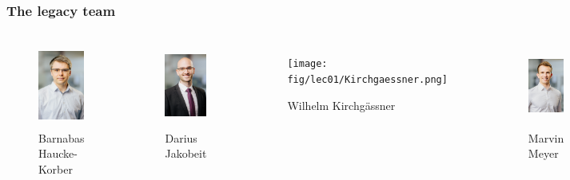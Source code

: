 \begin{frame}
\frametitle{The legacy team}
\vspace{-0.5cm}
\begin{columns}[t]

	\begin{figure}
		\centering
			\includegraphics[height=2.75cm]{fig/lec01/Hauke.jpg}
			\caption*{Barnabas \\Haucke-Korber}
	\end{figure}

	\begin{figure}
		\centering
			\includegraphics[height=2.75cm]{fig/lec01/Jakobeit.jpg}
			\caption*{Darius \\Jakobeit}
	\end{figure}
			
	\begin{figure}
		\centering
			\texttt{[image: fig/lec01/Kirchgaessner.png]}
			\caption*{Wilhelm Kirchgässner}
	\end{figure}
	
	\begin{figure}
		\centering
			\includegraphics[height=2.75cm]{fig/lec01/Meyer.jpg}
			\caption*{Marvin \\Meyer}
	\end{figure}
	
	\begin{figure}
		\centering
			\includegraphics[height=2.75cm]{fig/lec01/Schenke.jpg}
			\caption*{Maximilian Schenke}
	\end{figure}
	

\end{columns}
\end{frame}
